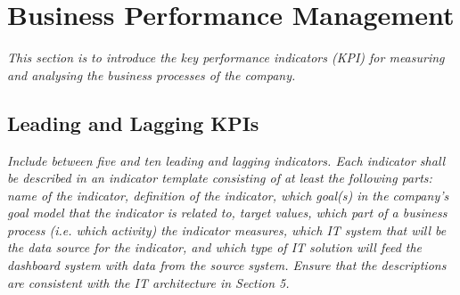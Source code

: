 \documentclass{article}
\begin{document}
\section{Business Performance Management}
\textit{
This section is to introduce the key performance indicators (KPI) for measuring and analysing the business processes of the company.
}

\subsection{Leading and Lagging KPIs}
\textit{
Include between five and ten leading and lagging indicators. Each indicator
shall be described in an indicator template consisting of at least the following
parts: name of the indicator, definition of the indicator, which goal(s) in the
company’s goal model that the indicator is related to, target values, which
part of a business process (i.e. which activity) the indicator measures, which
IT system that will be the data source for the indicator, and which type of
IT solution will feed the dashboard system with data from the source system.
Ensure that the descriptions are consistent with the IT architecture in Section
5.
}
\end{document}

